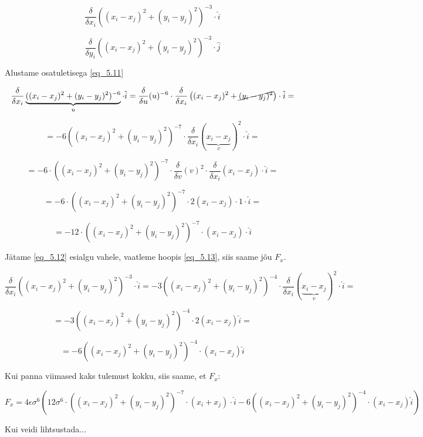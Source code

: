 \begin{flushleft}
\begin{equation} \label{eq_5.13}
 \dfrac{\delta }{\delta x_{i}}((x_{i}-x_{j})^{2}+(y_{i}-y_{j})^{2})^{-3} \cdot \hat{i}
\end{equation}

\begin{equation} \label{eq_5.14}
 \dfrac{\delta }{\delta y_{i}}((x_{i}-x_{j})^{2}+(y_{i}-y_{j})^{2})^{-3}\cdot \hat{j} 
\end{equation}

Alustame osatuletisega \ref{eq_5.11}

\[ \dfrac{\delta }{\delta x_{i}} \underbrace{((x_{i}-x_{j})^{2}+(y_{i}-y_{j})^{2})^{-6}}_{u}\cdot \hat{i} =\dfrac{\delta}{\delta u} (u)^{-6} \cdot  \dfrac{\delta }{\delta x_{i}} \left( (x_{i}-x_{j})^{2}+\cancel{(y_{i}-y_{j})^{2}} \right) \cdot \hat{i}=\]

\[= -6((x_{i}-x_{j})^{2}+(y_{i}-y_{j})^{2}) ^{-7} \cdot \dfrac{\delta}{\delta x_{i}} (\underbrace{x_{i}-x_{j}}_{v})^{2} \cdot \hat{i}=\]

\[ = -6 \cdot \left(  (x_{i} -x_{j})^{2}+(y_{i}-y_{j})^{2}\right)^{-7} \cdot \dfrac{\delta}{\delta v} (v)^{2} \cdot \dfrac{\delta}{\delta x_{i}}(x_{i}-x_{j}) \cdot \hat{i}= \]

\[=-6 \cdot \left(  (x_{i} -x_{j})^{2}+(y_{i}-y_{j})^{2}\right)^{-7} \cdot 2 (x_{i}-x_{j}) \cdot 1 \cdot \hat{i} =\]

\[=-12 \cdot \left(  (x_{i} -x_{j})^{2}+(y_{i}-y_{j})^{2}\right)^{-7} \cdot  (x_{i}-x_{j}) \cdot \hat{i} \]

Jätame \ref{eq_5.12} esialgu vahele, vaatleme hoopis \ref{eq_5.13}, siis saame jõu $F_{x}$.

\[ \dfrac{\delta }{\delta x_{i}}((x_{i}-x_{j})^{2}+(y_{i}-y_{j})^{2})^{-3} \cdot \hat{i}= -3((x_{i}-x_{j})^{2}+(y_{i}-y_{j})^{2}) ^{-4} \cdot \dfrac{\delta}{\delta x_{i}} (\underbrace{x_{i}-x_{j}}_{v})^{2} \cdot \hat{i}=\]

\[=-3((x_{i}-x_{j})^{2}+(y_{i}-y_{j})^{2}) ^{-4} \cdot 2 (x_{i}-x_{j}) \hat{i}= \]

\[=-6((x_{i}-x_{j})^{2}+(y_{i}-y_{j})^{2}) ^{-4} \cdot (x_{i}-x_{j}) \hat{i} \]

Kui panna viimased kaks tulemust kokku, siis saame, et $F_{x}$:

\[
F_{x}=4 \epsilon \sigma^{6} (12 \sigma^{6} \cdot \left(  (x_{i} -x_{j})^{2}+(y_{i}-y_{j})^{2}\right)^{-7} \cdot  (x_{i}+x_{j}) \cdot \hat{i}  -6((x_{i}-x_{j})^{2}+(y_{i}-y_{j})^{2}) ^{-4} \cdot (x_{i}-x_{j}) \hat{i})
\]

Kui veidi lihtsustada...


\end{flushleft}
